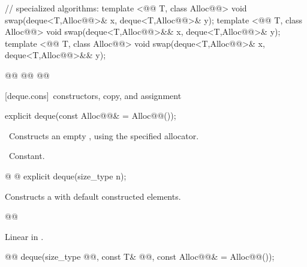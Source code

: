 \documentclass[american,twoside]{book}
\begin{document}
\begin{codeblock}
{  // specialized algorithms:
  template <@@ T, class Alloc@@>
    void swap(deque<T,Alloc@@>& x, deque<T,Alloc@@>& y);
  template <@@ T, class Alloc@@>
    void swap(deque<T,Alloc@@>&& x, deque<T,Alloc@@>& y);
  template <@@ T, class Alloc@@>
    void swap(deque<T,Alloc@@>& x, deque<T,Alloc@@>&& y);

  @@
    @@
      @@
}
\end{codeblock}

[deque.cons]{\ constructors, copy, and assignment}

\begin{itemdecl}
explicit deque(const Alloc@@& = Alloc@@());
\end{itemdecl}

\begin{itemdescr}
\pnum
\effects\ 
Constructs an empty
,
using the specified allocator.

\pnum
\complexity\ 
Constant.
\end{itemdescr}

\begin{itemdecl}
@ @ explicit deque(size_type n);
\end{itemdecl}

\begin{itemdescr}
\pnum
\effects Constructs a  with
 default constructed elements.

\pnum
@@

\pnum
\complexity Linear in .
\end{itemdescr}

\begin{itemdecl}
@@
deque(size_type @@, const T& @@,
      const Alloc@@& = Alloc@\removedConcepts{ator}@());
\end{itemdecl}
\end{document}
